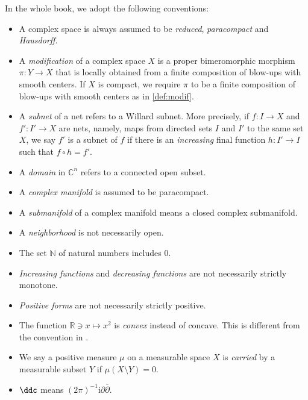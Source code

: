 %
%


In the whole book, we adopt the following conventions:
\begin{itemize}
    \item A complex space is always assumed to be \emph{reduced}, \emph{paracompact} and \emph{Hausdorff}.
    \item A \emph{modification} of a complex space $X$ is a proper bimeromorphic morphism $\pi\colon Y\rightarrow X$ that is locally obtained from a finite composition of blow-ups with smooth centers. If $X$ is compact, we require $\pi$ to be a finite composition of blow-ups with smooth centers as in \cref{def:modif}.
    \item A \emph{subnet} of a net refers to a Willard subnet. More precisely, if $f\colon I\rightarrow X$ and $f'\colon I'\rightarrow X$ are nets, namely, maps from directed sets $I$ and $I'$ to the same set $X$, we say $f'$ is a subnet of $f$ if there is an \emph{increasing} final function $h\colon I'\rightarrow I$ such that $f\circ h=f'$.
    \item A \emph{domain} in $\mathbb{C}^n$ refers to a connected open subset.
    \item A \emph{complex manifold} is assumed to be paracompact.
    \item A \emph{submanifold} of a complex manifold means a closed complex submanifold.
    \item A \emph{neighborhood} is not necessarily open.
    \item The set $\mathbb{N}$ of natural numbers includes $0$.
    \item \emph{Increasing functions} and \emph{decreasing functions} are not necessarily strictly monotone.
    \item \emph{Positive forms} are not necessarily strictly positive.
    \item The function $\mathbb{R}\ni x \mapsto x^2$ is \emph{convex} instead of concave. This is different from the convention in \cite{CLS11}.
    \item We say a positive measure $\mu$ on a measurable space $X$ is \emph{carried} by a measurable subset $Y$ if $\mu(X\setminus Y)=0$.
    \item $\ddc$ means $(2\pi)^{-1}\mathrm{i}\partial \overline{\partial}$.
\end{itemize}
